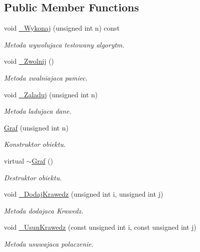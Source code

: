 \subsection*{Public Member Functions}
\begin{DoxyCompactItemize}
\item 
void \hyperlink{class_graf_ac984753beb24de86d092a08b2cf844f1}{\-\_\-\-Wykonaj} (unsigned int n) const 
\begin{DoxyCompactList}\small\item\em Metoda wywolujaca testowany algorytm. \end{DoxyCompactList}\item 
void \hyperlink{class_graf_aaeb5adbe10a1a4fafdd0f62dac5ddbba}{\-\_\-\-Zwolnij} ()
\begin{DoxyCompactList}\small\item\em Metoda zwalniajaca pamiec. \end{DoxyCompactList}\item 
void \hyperlink{class_graf_adcb32f2e96badaa4d3cccd9de519f5b3}{\-\_\-\-Zaladuj} (unsigned int n)
\begin{DoxyCompactList}\small\item\em Metoda ladujaca dane. \end{DoxyCompactList}\item 
\hyperlink{class_graf_a95213c95392b1b99f83fcf89be540230}{Graf} (unsigned int n)
\begin{DoxyCompactList}\small\item\em Konstruktor obiektu. \end{DoxyCompactList}\item 
virtual \hyperlink{class_graf_ae738931dd17ef4e133757e76b960fc99}{$\sim$\-Graf} ()
\begin{DoxyCompactList}\small\item\em Destruktor obiektu. \end{DoxyCompactList}\item 
void \hyperlink{class_graf_a96466f767c7b1145421cf0c17a532449}{\-\_\-\-Dodaj\-Krawedz} (unsigned int i, unsigned int j)
\begin{DoxyCompactList}\small\item\em Metoda dodajaca Krawedz. \end{DoxyCompactList}\item 
void \hyperlink{class_graf_aea242f1a0b19b5768d516f92d224967f}{\-\_\-\-Usun\-Krawedz} (const unsigned int i, const unsigned int j)
\begin{DoxyCompactList}\small\item\em Metoda usuwajaca polaczenie. \end{DoxyCompactList}\item 

\end{DoxyCompactItemize}
